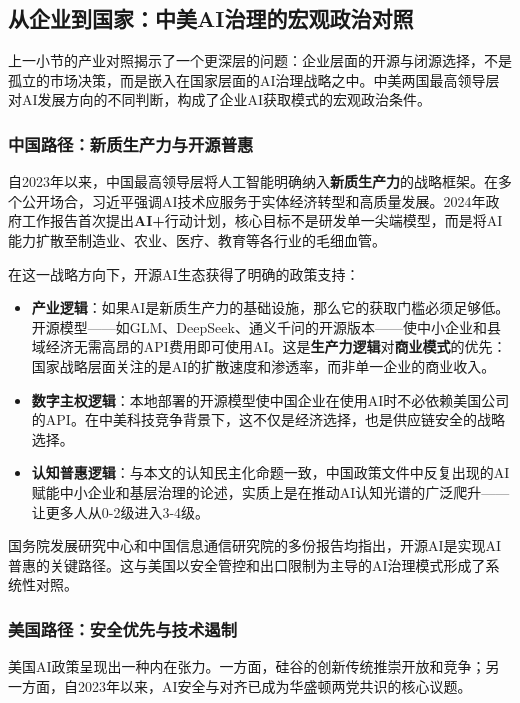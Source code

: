 \subsection{从企业到国家：中美AI治理的宏观政治对照}

上一小节的产业对照揭示了一个更深层的问题：企业层面的开源与闭源选择，不是孤立的市场决策，而是嵌入在国家层面的AI治理战略之中。中美两国最高领导层对AI发展方向的不同判断，构成了企业AI获取模式的宏观政治条件。

\subsubsection{中国路径：新质生产力与开源普惠}

自2023年以来，中国最高领导层将人工智能明确纳入\textbf{新质生产力}的战略框架。在多个公开场合，习近平强调AI技术应服务于实体经济转型和高质量发展。2024年政府工作报告首次提出\textbf{AI+}行动计划，核心目标不是研发单一尖端模型，而是将AI能力扩散至制造业、农业、医疗、教育等各行业的毛细血管。

在这一战略方向下，开源AI生态获得了明确的政策支持：

\begin{itemize}
\item \textbf{产业逻辑}：如果AI是新质生产力的基础设施，那么它的获取门槛必须足够低。开源模型——如GLM、DeepSeek、通义千问的开源版本——使中小企业和县域经济无需高昂的API费用即可使用AI。这是\textbf{生产力逻辑}对\textbf{商业模式}的优先：国家战略层面关注的是AI的扩散速度和渗透率，而非单一企业的商业收入。
\item \textbf{数字主权逻辑}：本地部署的开源模型使中国企业在使用AI时不必依赖美国公司的API。在中美科技竞争背景下，这不仅是经济选择，也是供应链安全的战略选择。
\item \textbf{认知普惠逻辑}：与本文的认知民主化命题一致，中国政策文件中反复出现的AI赋能中小企业和基层治理的论述，实质上是在推动AI认知光谱的广泛爬升——让更多人从0-2级进入3-4级。
\end{itemize}

国务院发展研究中心和中国信息通信研究院的多份报告均指出，开源AI是实现AI普惠的关键路径。这与美国以安全管控和出口限制为主导的AI治理模式形成了系统性对照。

\subsubsection{美国路径：安全优先与技术遏制}

美国AI政策呈现出一种内在张力。一方面，硅谷的创新传统推崇开放和竞争；另一方面，自2023年以来，AI安全与对齐已成为华盛顿两党共识的核心议题。

